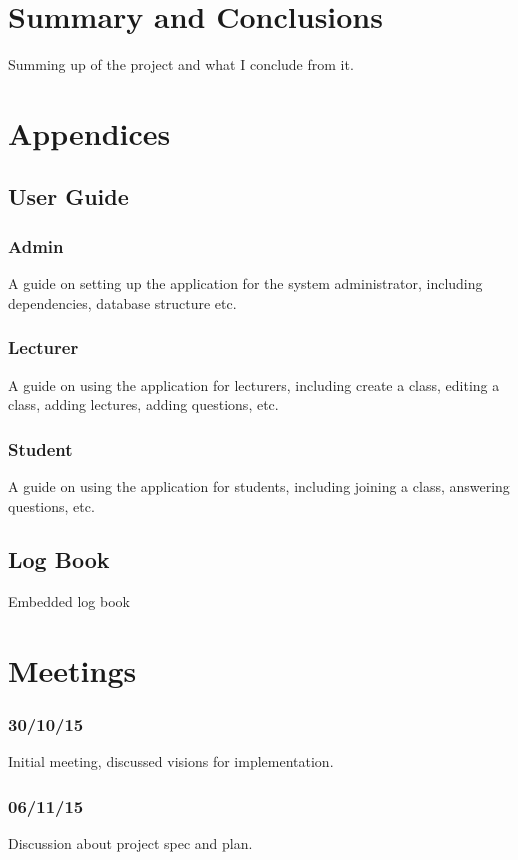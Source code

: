 \documentclass{article}
\begin{document}
\section{Summary and Conclusions}
Summing up of the project and what I conclude from it.

\section{Appendices}
\subsection{User Guide}
\subsubsection{Admin}
A guide on setting up the application for the system administrator, including dependencies, database structure etc.

\subsubsection{Lecturer}
A guide on using the application for lecturers, including create a class, editing a class, adding lectures, adding questions, etc.

\subsubsection{Student}
A guide on using the application for students, including joining a class, answering questions, etc.

\subsection{Log Book}
Embedded log book


\newpage
\section{Meetings}
\subsubsection{30/10/15}
Initial meeting, discussed visions for implementation.

\subsubsection{06/11/15}
Discussion about project spec and plan.
\end{document}
